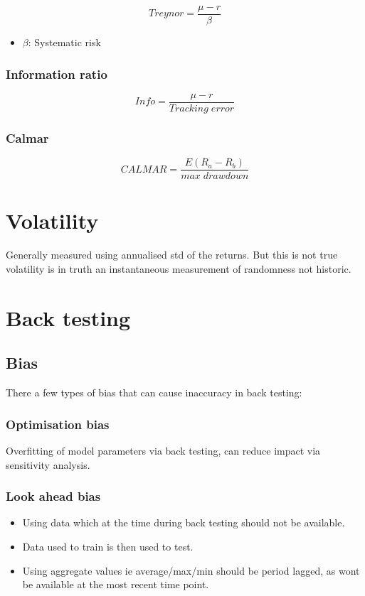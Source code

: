 \documentclass[11pt]{scrartcl} %
\begin{document}
\[ Treynor=\frac{\mu -r}{\beta } \]

\begin{itemize}
	\item $\beta $: Systematic risk
\end{itemize}

\subsubsection{Information ratio}

\[ Info = \frac{\mu -r}{Tracking\;error} \]

\subsubsection{Calmar}

\[ CALMAR = \frac{E(R_a-R_b)}{max\;drawdown}\]

\section{Volatility}

Generally measured using annualised std of the returns. But this is not true volatility is
in truth an instantaneous measurement of randomness not historic.

\section{Back testing}

\subsection{Bias}

There a few types of bias that can cause inaccuracy in back testing:

\subsubsection{Optimisation bias}

Overfitting of model parameters via back testing, can reduce impact via sensitivity analysis.

\subsubsection{Look ahead bias}

\begin{itemize}
	\item Using data which at the time during back testing should not be available. 
	\item Data used to train is then used to test.
	\item Using aggregate values ie average/max/min should be period lagged, 
	as wont be available at the most recent time point.
\end{itemize}
\end{document}

